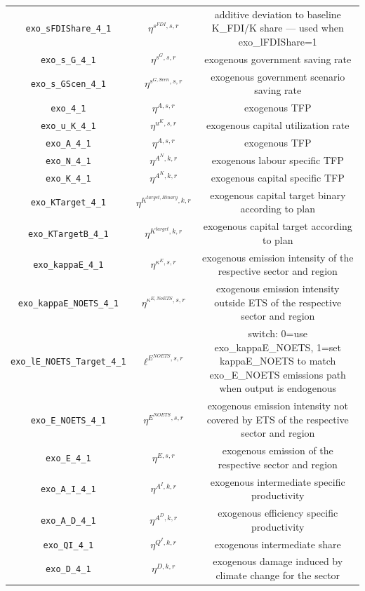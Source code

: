 \begin{center}
\begin{longtable}{ccc}
\texttt{exo\_sFDIShare\_4\_1} & ${\eta^{s^{FDI},s,r}}$ & additive deviation to baseline K\_FDI/K share — used when exo\_lFDIShare=1\\
\texttt{exo\_s\_G\_4\_1} & ${\eta^{s^G,s,r}}$ & exogenous government saving rate\\
\texttt{exo\_s\_GScen\_4\_1} & ${\eta^{s^{G,Scen},s,r}}$ & exogenous government scenario saving rate\\
\texttt{exo\_4\_1} & ${\eta^{A,s,r}}$ & exogenous TFP\\
\texttt{exo\_u\_K\_4\_1} & ${\eta^{u^K,s,r}}$ & exogenous capital utilization rate\\
\texttt{exo\_A\_4\_1} & ${\eta^{A,s,r}}$ & exogenous TFP\\
\texttt{exo\_N\_4\_1} & ${\eta^{A^{N},k,r}}$ & exogenous labour specific TFP\\
\texttt{exo\_K\_4\_1} & ${\eta^{A^{K},k,r}}$ & exogenous capital specific TFP\\
\texttt{exo\_KTarget\_4\_1} & ${\eta^{K^{target,Binary},k,r}}$ & exogenous capital target binary according to plan\\
\texttt{exo\_KTargetB\_4\_1} & ${\eta^{K^{target},k,r}}$ & exogenous capital target according to plan\\
\texttt{exo\_kappaE\_4\_1} & ${\eta^{\kappa^{E},s,r}}$ & exogenous emission intensity of the respective sector and region\\
\texttt{exo\_kappaE\_NOETS\_4\_1} & ${\eta^{\kappa^{E,No ETS},s,r}}$ & exogenous emission intensity outside ETS of the respective sector and region\\
\texttt{exo\_lE\_NOETS\_Target\_4\_1} & ${\ell^{E^{NOETS},s,r}}$ & switch: 0=use exo\_kappaE\_NOETS, 1=set kappaE\_NOETS to match exo\_E\_NOETS emissions path when output is endogenous\\
\texttt{exo\_E\_NOETS\_4\_1} & ${\eta^{E^{NOETS},s,r}}$ & exogenous emission intensity not covered by ETS of the respective sector and region\\
\texttt{exo\_E\_4\_1} & ${\eta^{E,s,r}}$ & exogenous emission of the respective sector and region\\
\texttt{exo\_A\_I\_4\_1} & ${\eta^{A^{I},k,r}}$ & exogenous intermediate specific productivity\\
\texttt{exo\_A\_D\_4\_1} & ${\eta^{A^{D},k,r}}$ & exogenous efficiency specific productivity\\
\texttt{exo\_QI\_4\_1} & ${\eta^{Q^{I},k,r}}$ & exogenous intermediate share\\
\texttt{exo\_D\_4\_1} & ${\eta^{D,k,r}}$ & exogenous damage induced by climate change for the sector\\

\end{longtable}
\end{center}
